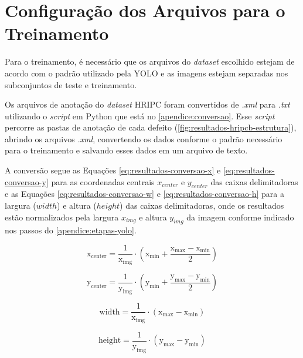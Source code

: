 \section{Configuração dos Arquivos para o Treinamento} \label{cap:treinamento-treinamento-config}

Para o treinamento, é necessário que os arquivos do \textit{dataset} escolhido estejam de acordo com o padrão utilizado pela YOLO e as imagens estejam separadas nos subconjuntos de teste e treinamento.

Os arquivos de anotação do \textit{dataset} HRIPC foram convertidos de \textit{.xml} para \textit{.txt} utilizando o \textit{script} em Python que está no \autoref{apendice:conversao}.
Esse \textit{script} percorre as pastas de anotação de cada defeito (\autoref{fig:resultados-hripcb-estrutura}), abrindo os arquivos \textit{.xml}, convertendo os dados conforme o padrão necessário para o treinamento e salvando esses dados em um arquivo de texto.

A conversão segue as Equações \ref{eq:resultados-conversao-x} e \ref{eq:resultados-conversao-y} para as coordenadas centrais $x_{center}$ e $y_{center}$ das caixas delimitadoras e as Equações \ref{eq:resultados-conversao-w} e \ref{eq:resultados-conversao-h} para a largura ($width$) e altura ($height$) das caixas delimitadoras, onde os resultados estão normalizados pela largura $x_{img}$ e altura  $y_{img}$ da imagem conforme indicado nos passos do \autoref{apendice:etapas-yolo}.

\begin{equation} \label{eq:resultados-conversao-x}
\mathrm{
  x_{center} = \frac{1}{x_{img}} \cdot ( x_{min} + \frac{x_{max} - x_{min}}{2})
}
\end{equation}

\begin{equation} \label{eq:resultados-conversao-y}
\mathrm{
  y_{center} = \frac{1}{y_{img}} \cdot ( y_{min} + \frac{y_{max} - y_{min}}{2})
}
\end{equation}

\begin{equation} \label{eq:resultados-conversao-w}
\mathrm{
  width = \frac{1}{x_{img}} \cdot (x_{max} - x_{min})
}
\end{equation}

\begin{equation} \label{eq:resultados-conversao-h}
\mathrm{
  height = \frac{1}{y_{img}} \cdot (y_{max} - y_{min})
}
\end{equation}

